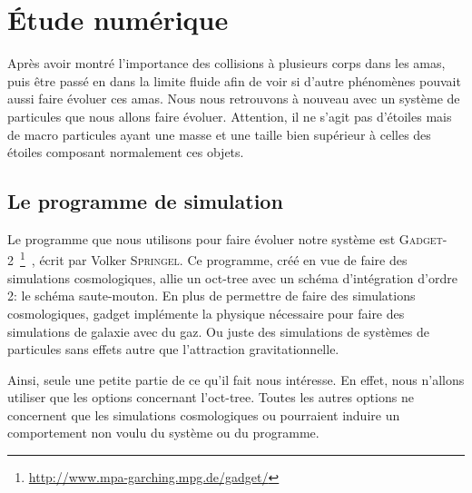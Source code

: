 \chapter{Étude numérique}
	\minitoc

	Après avoir montré l'importance des collisions à plusieurs corps dans les amas, puis être passé en dans la
	limite fluide afin de voir si d'autre phénomènes pouvait aussi faire évoluer ces amas. Nous nous retrouvons à
	nouveau avec un système de particules que nous allons faire évoluer. Attention, il ne s'agit pas d'étoiles mais
	de macro particules ayant une masse et une taille bien supérieur à celles des étoiles composant normalement ces
	objets.


	\section{Le programme de simulation}

		Le programme que nous utilisons pour faire évoluer notre système est
		\textsc{Gadget-2}~\footnote{\url{http://www.mpa-garching.mpg.de/gadget/}}~\cite{gadget2},
		écrit par Volker \textsc{Springel}.
		Ce programme, créé en vue de faire des simulations cosmologiques, allie un oct-tree avec un schéma
		d'intégration d'ordre 2: le schéma saute-mouton.
		En plus de permettre de faire des simulations cosmologiques, gadget implémente la physique nécessaire
		pour faire des simulations de galaxie avec du gaz. Ou juste des simulations de systèmes de particules
		sans effets autre que l'attraction gravitationnelle.

		Ainsi, seule une petite partie de ce qu'il fait nous intéresse. En effet, nous n'allons utiliser que les options
		concernant l'oct-tree. Toutes les autres options ne concernent que les simulations
		cosmologiques ou pourraient induire un comportement non voulu du système ou du programme.

